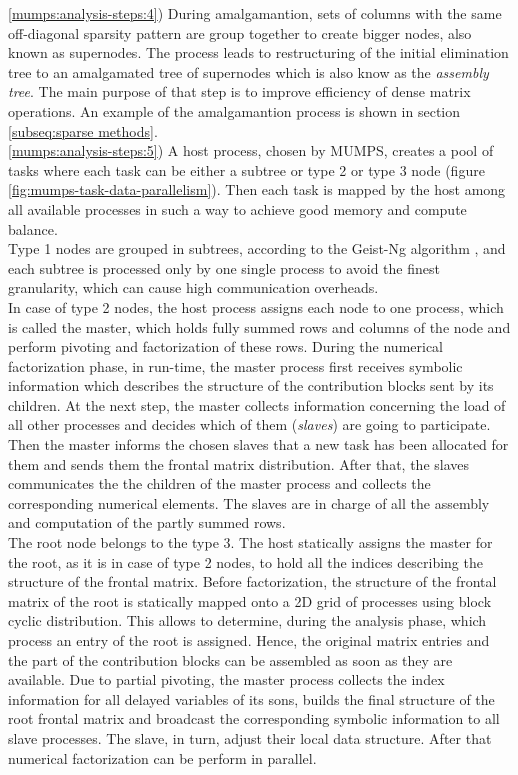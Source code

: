\ref{mumps:analysis-steps:4}) During amalgamantion, sets of columns with the same off-diagonal sparsity pattern are group together to create bigger nodes, also known as supernodes. The process leads to restructuring of the initial elimination tree to an amalgamated tree of supernodes which is also know as the \textit{assembly tree}. The main purpose of that step is to improve efficiency of dense matrix operations. An example of the amalgamantion process is shown in section \ref{subseq:sparse methods}.\\


\ref{mumps:analysis-steps:5}) A host process, chosen by MUMPS, creates a pool of tasks where each task can be either a subtree or type 2 or type 3 node (figure \ref{fig:mumps-task-data-parallelism}). Then each task is mapped by the host among all available processes in such a way to achieve good memory and compute balance.\\

 
Type 1 nodes are grouped in subtrees, according to the Geist-Ng algorithm \cite{geist1989task}, and each subtree is processed only by one single process to avoid the finest granularity, which can cause high communication overheads. \\


In case of type 2 nodes, the host process assigns each node to one process, which is called the master, which holds fully summed rows and columns of the node and perform pivoting and factorization of these rows. During the numerical factorization phase, in run-time, the master process first receives symbolic information which describes the structure of the contribution blocks sent by its children. At the next step, the master collects information concerning the load of all other processes and decides which of them (\textit{slaves}) are going to participate. Then the master informs the chosen slaves that a new task has been allocated for them and sends them the frontal matrix distribution. After that, the slaves communicates the the children of the master process and collects the corresponding numerical elements. The slaves are in charge of all the assembly and computation of the partly summed rows. \\


The root node belongs to the type 3. The host statically assigns the master for the root, as it is in case of type 2 nodes, to hold all the indices describing the structure of the frontal matrix. Before factorization, the structure of the frontal matrix of the root is statically mapped onto a 2D grid of processes using block cyclic distribution. This allows to determine, during the analysis phase, which process an entry of the root is assigned. Hence, the original matrix entries and the part of the contribution blocks can be assembled as soon as they are available. Due to partial pivoting, the master process collects the index information for all delayed variables of its sons, builds the final structure of the root frontal matrix and broadcast the corresponding symbolic information to all slave processes. The slave, in turn, adjust their local data structure. After that numerical factorization can be perform in parallel.\\


